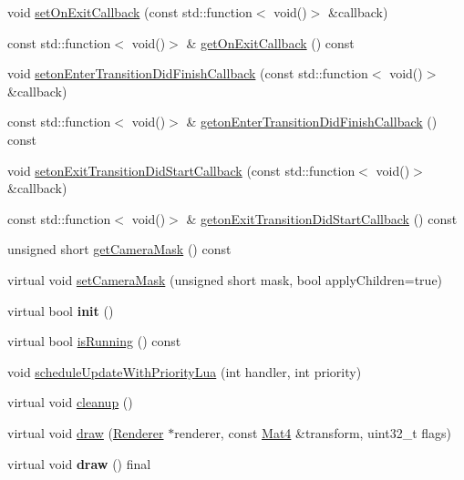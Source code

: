 \begin{DoxyCompactItemize}
\item 
void \hyperlink{classNode_a82e2254c47969bfa81be037230738367}{set\+On\+Exit\+Callback} (const std\+::function$<$ void()$>$ \&callback)
\item 
const std\+::function$<$ void()$>$ \& \hyperlink{classNode_ab0b4c33e5b8ef5770d0f4d8ed410e596}{get\+On\+Exit\+Callback} () const
\item 
void \hyperlink{classNode_aad666c48b3a6952c3c4b6c4c1eb446ad}{seton\+Enter\+Transition\+Did\+Finish\+Callback} (const std\+::function$<$ void()$>$ \&callback)
\item 
const std\+::function$<$ void()$>$ \& \hyperlink{classNode_af905ed9ea4b7884fdb9be2b8b2fbcf53}{geton\+Enter\+Transition\+Did\+Finish\+Callback} () const
\item 
void \hyperlink{classNode_aca0270c92c148c57b0605aae8298e356}{seton\+Exit\+Transition\+Did\+Start\+Callback} (const std\+::function$<$ void()$>$ \&callback)
\item 
const std\+::function$<$ void()$>$ \& \hyperlink{classNode_a306d572d520d31dd83ed3eedd2b78d4e}{geton\+Exit\+Transition\+Did\+Start\+Callback} () const
\item 
unsigned short \hyperlink{classNode_a1c849d2d0bd878a4e3dd1a52ab90fee8}{get\+Camera\+Mask} () const
\item 
virtual void \hyperlink{classNode_a0403546687b2cb6fc211fb461e33ba4d}{set\+Camera\+Mask} (unsigned short mask, bool apply\+Children=true)
\item 
\mbox{\label{classNode_a6293815ad5f410cf3e1378fcb98b2ff7}} 
virtual bool {\bfseries init} ()
\item 
virtual bool \hyperlink{classNode_af5dc885c0dbeceaa3857b52dff68ed4b}{is\+Running} () const
\item 
void \hyperlink{classNode_a0fc543c82cc9b139cfb57f65eb770fb0}{schedule\+Update\+With\+Priority\+Lua} (int handler, int priority)
\item 
virtual void \hyperlink{classNode_a4f07dff5b7089859092bece5f328aa5d}{cleanup} ()
\item 
virtual void \hyperlink{classNode_a6f8fdadb6e26b198cb15920e4d998754}{draw} (\hyperlink{classRenderer}{Renderer} $\ast$renderer, const \hyperlink{classMat4}{Mat4} \&transform, uint32\+\_\+t flags)
\item 
\mbox{\label{classNode_ae847c0d9a021be8f256ac206b0698bf6}} 
virtual void {\bfseries draw} () final
\item 

\end{DoxyCompactItemize}

